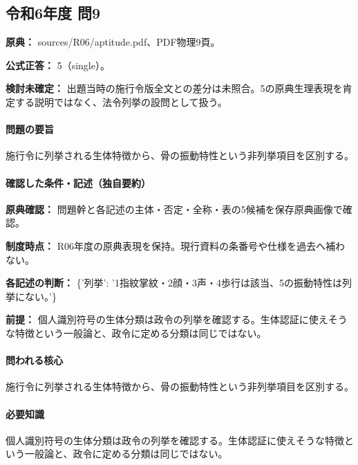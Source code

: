 \subsection{令和6年度 問9}
\label{q:r06-reg-apt-09}

\noindent\textbf{原典：} sources/R06/aptitude.pdf、PDF物理9頁。

\textbf{公式正答：} 5（single）。

\par\textbf{検討未確定：} 出題当時の施行令版全文との差分は未照合。5の原典生理表現を肯定する説明ではなく、法令列挙の設問として扱う。

\paragraph{問題の要旨} 施行令に列挙される生体特徴から、骨の振動特性という非列挙項目を区別する。

\paragraph{確認した条件・記述（独自要約）}\mbox{}\par

\noindent\textbf{原典確認：} 問題幹と各記述の主体・否定・全称・表の5候補を保存原典画像で確認。\par

\noindent\textbf{制度時点：} R06年度の原典表現を保持。現行資料の条番号や仕様を過去へ補わない。\par

\noindent\textbf{各記述の判断：} \{'列挙': '1指紋掌紋・2顔・3声・4歩行は該当、5の振動特性は列挙にない。'\}\par

\noindent\textbf{前提：} 個人識別符号の生体分類は政令の列挙を確認する。生体認証に使えそうな特徴という一般論と、政令に定める分類は同じではない。\par

\paragraph{問われる核心} 施行令に列挙される生体特徴から、骨の振動特性という非列挙項目を区別する。

\paragraph{必要知識} 個人識別符号の生体分類は政令の列挙を確認する。生体認証に使えそうな特徴という一般論と、政令に定める分類は同じではない。

